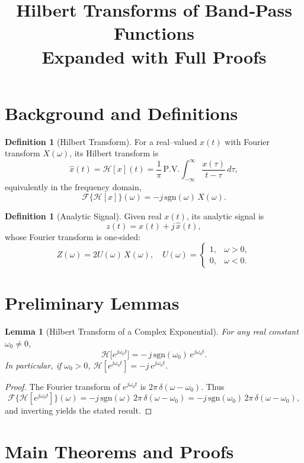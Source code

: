 \documentclass[12pt]{article}
\title{Hilbert Transforms of Band‐Pass Functions\\[0.5ex]\large Expanded with Full Proofs}
\author{}
\date{}
\theoremstyle{plain}
\newtheorem{lemma}[theorem]{Lemma}
\theoremstyle{definition}
\newtheorem{definition}[theorem]{Definition}
\theoremstyle{remark}
\begin{document}
\maketitle

\section{Background and Definitions}

\begin{definition}[Hilbert Transform]
For a real–valued $x(t)$ with Fourier transform $X(\omega)$, its Hilbert transform is
\[
\widehat{x}(t)
= \mathcal{H}[x](t)
= \frac{1}{\pi}\,\mathrm{P.V.}\!\int_{-\infty}^{\infty}\frac{x(\tau)}{t-\tau}\,d\tau,
\]
equivalently in the frequency domain,
\[
\mathcal{F}\{\mathcal{H}[x]\}(\omega)
= -j\,\mathrm{sgn}(\omega)\,X(\omega).
\]
\end{definition}

\begin{definition}[Analytic Signal]
Given real $x(t)$, its analytic signal is
\[
z(t) = x(t) + j\,\widehat{x}(t),
\]
whose Fourier transform is one‐sided:
\[
Z(\omega) = 2U(\omega)\,X(\omega),
\quad U(\omega)=
\begin{cases}1,&\omega>0,\\0,&\omega<0.\end{cases}
\]
\end{definition}

\section{Preliminary Lemmas}

\begin{lemma}[Hilbert Transform of a Complex Exponential]
\label{lem:exp}
For any real constant $\omega_0\neq0$,
\[
\mathcal{H}\bigl[e^{j\omega_0 t}\bigr]
= -\,j\,\mathrm{sgn}(\omega_0)\,e^{j\omega_0 t}.
\]
In particular, if $\omega_0>0$, $\mathcal{H}[e^{j\omega_0t}]=-j\,e^{j\omega_0t}$.
\end{lemma}

\begin{proof}
The Fourier transform of $e^{j\omega_0t}$ is $2\pi\,\delta(\omega-\omega_0)$.  Thus
\[
\mathcal{F}\{\mathcal{H}[e^{j\omega_0t}]\}(\omega)
= -j\,\mathrm{sgn}(\omega)\,2\pi\,\delta(\omega-\omega_0)
= -j\,\mathrm{sgn}(\omega_0)\,2\pi\,\delta(\omega-\omega_0),
\]
and inverting yields the stated result.
\end{proof}

\section{Main Theorems and Proofs}
\end{document}
